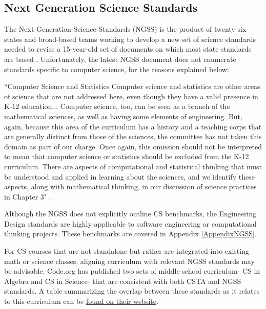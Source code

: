 \subsection{Next Generation Science Standards}
The Next Generation Science Standards (NGSS) is the product of twenty-six states and broad-based teams working to develop a new set of science standards needed to revise a 15-year-old set of documents on which most state standards are based \cite{ngsss}. Unfortunately, the latest NGSS document does not enumerate standards specific to computer science, for the reasons explained below:
\begin{blockquote}
``Computer Science and Statistics Computer science and statistics are other areas of science that are not addressed here, even though they have a valid presence in K-12 education... Computer science, too, can be seen as a branch of the mathematical sciences, as well as having some elements of engineering. But, again, because this area of the curriculum has a history and a teaching corps that are generally distinct from those of the sciences, the committee has not taken this domain as part of our charge. Once again, this omission should not be interpreted to mean that computer science or statistics should be excluded from the K-12 curriculum. There are aspects of computational and statistical thinking that must be understood and applied in learning about the sciences, and we identify these aspects, along with mathematical thinking, in our discussion of science practices in Chapter 3" \cite{ngsss}. 
\end{blockquote}\par
Although the NGSS does not explicitly outline CS benchmarks, the Engineering Design standards are highly applicable to software engineering or computational thinking projects. These benchmarks are covered in Appendix \ref{AppendixNGSS}. \par
For CS courses that are not standalone but rather are integrated into existing math or science classes, aligning curriculum with relevant NGSS standards may be advisable. Code.org has published two sets of middle school curriculum- CS in Algebra and CS in Science- that are consistent with both CSTA and NGSS standards. A table summarizing the overlap between these standards as it relates to this curriculum can be \href{https://code.org/curriculum/science}{found on their website}.

